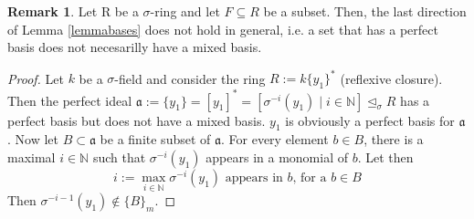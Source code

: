 \documentclass{article}
\def\N{\mathbb{N}}
\def\a{\mathfrak{a}}
\def\s{\sigma}
\def\si{\unlhd_{\sigma}}
\newenvironment{bew}{\begin{proof}[Proof]}{\end{proof}}
\theoremstyle{definition}
\newtheorem{rem}[Satz]{Remark}
\begin{document}
\begin{rem}
Let R be a $\s$-ring and let $F \subseteq R$ be a subset. Then, the last direction of Lemma \ref{lemmabases} does not hold in general, i.e. a set that has a perfect basis does not necesarilly have a mixed basis.
\begin{bew}
Let $k$ be a $\s$-field and consider the ring $R:= k\{y_1\}^*$ (reflexive closure). Then the perfect ideal $\a:= \{y_1\} = [y_1]^* = [ \sigma^{-i}(y_1) \mid i \in \N] \si R$ has a perfect basis but does not have a mixed basis.
$y_1$ is obviously a perfect basis for $\a$. Now let $B \subset \a$ be a finite subset of $\a$. For every element $b \in B$, there is a maximal $i \in \N$ such that $\s^{-i}(y_1)$ appears in a monomial of $b$. 
Let then \[ i := \max_{i \in \N} \s^{-i}(y_1) \text{ appears in }b \text{, for a }b \in B \]
Then $\s^{-i-1}(y_1) \notin \{B\}_m$. %
\end{bew}
\end{rem}
\end{document}
